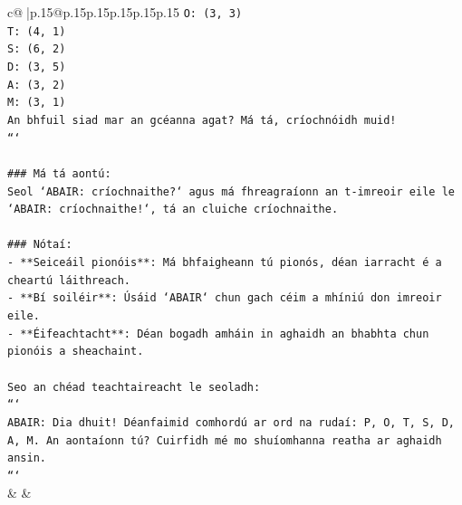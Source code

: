 \documentclass{article}
\begin{document}
{\begin{supertabular}{c@{$\;$}|p{.15\linewidth}@{}p{.15\linewidth}p{.15\linewidth}p{.15\linewidth}p{.15\linewidth}p{.15\linewidth}}
{{{\texttt{O: (3, 3)} \\
\texttt{T: (4, 1)} \\
\texttt{S: (6, 2)} \\
\texttt{D: (3, 5)} \\
\texttt{A: (3, 2)} \\
\texttt{M: (3, 1)} \\
\texttt{An bhfuil siad mar an gcéanna agat? Má tá, críochnóidh muid!} \\
\texttt{```} \\
\\ 
\texttt{\#\#\# Má tá aontú:} \\
\texttt{Seol `ABAIR: críochnaithe?` agus má fhreagraíonn an t{-}imreoir eile le `ABAIR: críochnaithe!`, tá an cluiche críochnaithe.} \\
\\ 
\texttt{\#\#\# Nótaí:} \\
\texttt{{-} **Seiceáil pionóis**: Má bhfaigheann tú pionós, déan iarracht é a cheartú láithreach.} \\
\texttt{{-} **Bí soiléir**: Úsáid `ABAIR` chun gach céim a mhíniú don imreoir eile.} \\
\texttt{{-} **Éifeachtacht**: Déan bogadh amháin in aghaidh an bhabhta chun pionóis a sheachaint.} \\
\\ 
\texttt{Seo an chéad teachtaireacht le seoladh:} \\
\texttt{```} \\
\texttt{ABAIR: Dia dhuit! Déanfaimid comhordú ar ord na rudaí: P, O, T, S, D, A, M. An aontaíonn tú? Cuirfidh mé mo shuíomhanna reatha ar aghaidh ansin.} \\
\texttt{```} \\
            }
        }
    }
    & & \\ \\


\end{supertabular}}
\end{document}
